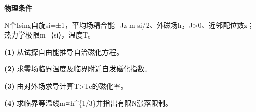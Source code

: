 \textbf{物理条件}\par N个Ising自旋si=±1，平均场耦合能−Jz m si/2、外磁场h，J>0、近邻配位数z；热力学极限m=⟨si⟩，温度T。
\par\noindent\textbf{(1)} 从试探自由能推导自洽磁化方程。
\par\noindent\textbf{(2)} 求零场临界温度及临界附近自发磁化指数。
\par\noindent\textbf{(3)} 由对外场求导计算T>Tc的磁化率。
\par\noindent\textbf{(4)} 求临界等温线m∝h\textasciicircum{}\{1/3\}并指出有限N涨落限制。
